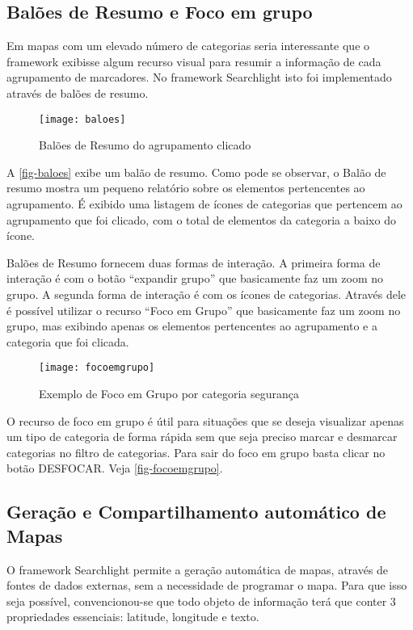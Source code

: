 \subsection{Balões de Resumo e Foco em grupo}
Em mapas com um elevado número de  categorias seria interessante que o framework exibisse algum recurso visual para resumir a informação de cada agrupamento de marcadores. 
No framework Searchlight isto foi implementado através de balões de resumo.

\begin{figure}[htb]
	\caption{\label{fig-baloes}Balões de Resumo do agrupamento clicado}
	\begin{center}
	    \texttt{[image: baloes]}
	\end{center}
\end{figure}

A \autoref{fig-baloes} exibe um balão de resumo. Como pode se observar, o Balão de resumo mostra um pequeno relatório sobre os elementos pertencentes ao agrupamento. É exibido uma listagem de ícones de categorias que pertencem ao agrupamento que foi clicado, com o total de elementos da categoria a baixo do ícone. 


Balões de Resumo fornecem duas formas de interação. A primeira forma de interação é com o botão ``expandir grupo'' que basicamente faz um zoom no grupo. A segunda forma de interação é com os ícones de categorias. Através dele é possível utilizar o recurso ``Foco em Grupo'' que basicamente faz um zoom no grupo, mas exibindo apenas os elementos pertencentes ao agrupamento e a categoria que foi clicada.

 \begin{figure}[htb]
	\caption{\label{fig-focoemgrupo}Exemplo de Foco em Grupo por categoria segurança}
	\begin{center}
	    \texttt{[image: focoemgrupo]}
	\end{center}
\end{figure}

O recurso de foco em grupo é útil para situações que se deseja visualizar apenas um tipo de categoria de forma rápida sem que seja preciso marcar e desmarcar categorias no filtro de categorias. Para sair do foco em grupo basta clicar no botão DESFOCAR. Veja \autoref{fig-focoemgrupo}.


\subsection{Geração e Compartilhamento automático de Mapas}
O framework Searchlight permite a geração automática de mapas, através de fontes de dados externas, sem a necessidade de programar o mapa. Para que isso seja possível, convencionou-se que todo objeto de informação terá que conter 3 propriedades essenciais: latitude, longitude e texto.  

